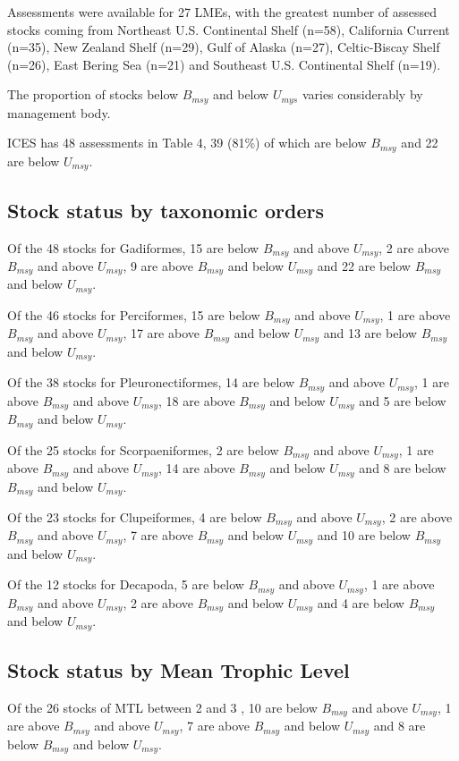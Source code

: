 Assessments were available for 27 LMEs, with the greatest number of
assessed stocks coming from Northeast U.S. Continental Shelf (n=58),
California Current (n=35), New Zealand Shelf (n=29),
Gulf of Alaska (n=27), Celtic-Biscay Shelf (n=26), East Bering Sea (n=21)
and Southeast U.S. Continental Shelf (n=19).

The proportion of stocks below $B_{msy}$ and below $U_{mys}$ varies considerably by management body. 

ICES has 48 assessments in Table 4,
39
(81\%) of which are below
$B_{msy}$ and 22 are below
$U_{msy}$.

\subsection*{Stock status by taxonomic orders}

Of the 48 stocks for Gadiformes, 15 are below $B_{msy}$ and above $U_{msy}$, 2 are above $B_{msy}$ and above $U_{msy}$, 9 are above $B_{msy}$ and below $U_{msy}$ and 22 are below $B_{msy}$ and below $U_{msy}$.

Of the 46 stocks for Perciformes, 15 are below $B_{msy}$ and above $U_{msy}$, 1 are above $B_{msy}$ and above $U_{msy}$, 17 are above $B_{msy}$ and below $U_{msy}$ and 13 are below $B_{msy}$ and below $U_{msy}$.

Of the 38 stocks for Pleuronectiformes, 14 are below $B_{msy}$ and above $U_{msy}$, 1 are above $B_{msy}$ and above $U_{msy}$, 18 are above $B_{msy}$ and below $U_{msy}$ and 5 are below $B_{msy}$ and below $U_{msy}$.

Of the 25 stocks for Scorpaeniformes, 2 are below $B_{msy}$ and above $U_{msy}$, 1 are above $B_{msy}$ and above $U_{msy}$, 14 are above $B_{msy}$ and below $U_{msy}$ and 8 are below $B_{msy}$ and below $U_{msy}$.

Of the 23 stocks for Clupeiformes, 4 are below $B_{msy}$ and above $U_{msy}$, 2 are above $B_{msy}$ and above $U_{msy}$, 7 are above $B_{msy}$ and below $U_{msy}$ and 10 are below $B_{msy}$ and below $U_{msy}$.

Of the 12 stocks for Decapoda, 5 are below $B_{msy}$ and above $U_{msy}$, 1 are above $B_{msy}$ and above $U_{msy}$, 2 are above $B_{msy}$ and below $U_{msy}$ and 4 are below $B_{msy}$ and below $U_{msy}$.


\subsection*{Stock status by Mean Trophic Level}
Of the 26 stocks of MTL between 2 and 3 , 10 are below $B_{msy}$ and above $U_{msy}$, 1 are above $B_{msy}$ and above $U_{msy}$, 7 are above $B_{msy}$ and below $U_{msy}$ and 8 are below $B_{msy}$ and below $U_{msy}$.

